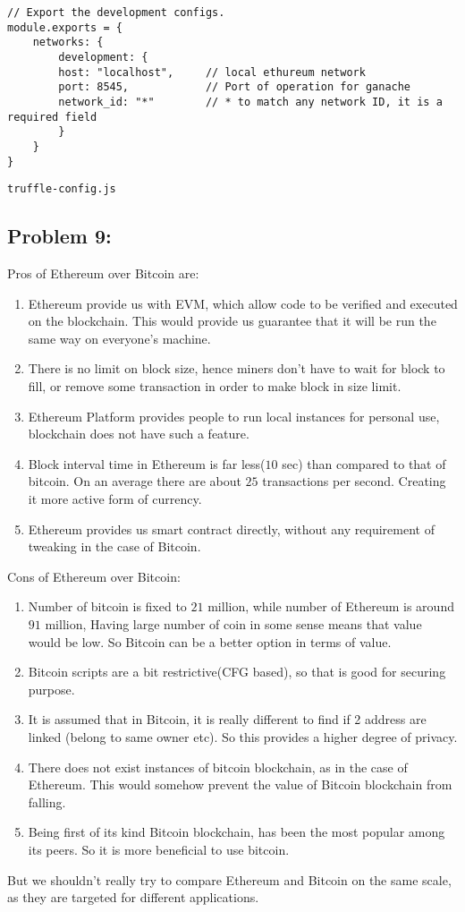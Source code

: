 \documentclass[a4paper]{article}
\begin{document}
\begin{lstlisting}[style=C++]
// Export the development configs.
module.exports = {
    networks: {
        development: {
        host: "localhost",     // local ethureum network
        port: 8545,            // Port of operation for ganache
        network_id: "*"        // * to match any network ID, it is a required field
        }
    }
}
\end{lstlisting}
\texttt{truffle-config.js} \\

\subsection*{Problem 9:}

Pros of Ethereum over Bitcoin are:
\begin{enumerate}
    \item Ethereum provide us with EVM, which allow code to be verified and executed on the blockchain. This would
          provide us guarantee that it will be run the same way on everyone's machine.
    \item There is no limit on block size, hence miners don't have to wait for block to fill, or
          remove some transaction in order to make block in size limit.
    \item Ethereum Platform provides people to run local instances for personal use, blockchain does
          not have such a feature.
    \item Block interval time in Ethereum is far less($10$ sec) than compared to that of bitcoin. On an
          average there are about $25$ transactions per second. Creating it more active form of currency.
    \item Ethereum provides us smart contract directly, without any requirement of tweaking in the case of
          Bitcoin.
\end{enumerate}

Cons of Ethereum over Bitcoin:
\begin{enumerate}
    \item Number of bitcoin is fixed to $21$ million, while number of Ethereum is around $91$ million,
          Having large number of coin in some sense means that value would be low. So Bitcoin can be a better option
          in terms of value.
    \item Bitcoin scripts are a bit restrictive(CFG based), so that is good for securing purpose.
    \item It is assumed that in Bitcoin, it is really different to find if 2 address are linked (belong to same owner etc).
          So this provides a higher degree of privacy. 
    \item There does not exist instances of bitcoin blockchain, as in the case of Ethereum. This would somehow
          prevent the value of Bitcoin blockchain from falling.
    \item Being first of its kind Bitcoin blockchain, has been the most popular among its peers. So it is more
          beneficial to use bitcoin.
\end{enumerate}

But we shouldn't really try to compare Ethereum and Bitcoin on the same scale,
as they are targeted for different applications.
\end{document}
